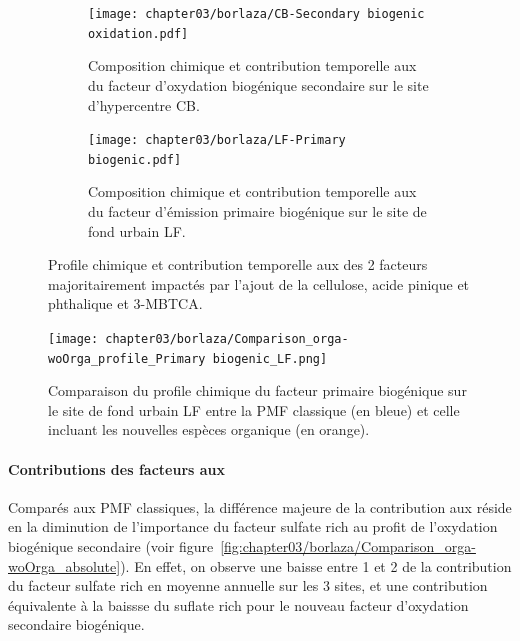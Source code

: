 \begin{figure}[ht]
    \centering
    \begin{subfigure}[t]{1\textwidth}
    \begin{center}
        \texttt{[image: chapter03/borlaza/CB-Secondary biogenic oxidation.pdf]}
    \end{center}
    \caption{Composition chimique et contribution temporelle aux \PMdix{} du facteur
    d'oxydation biogénique secondaire sur le site d'hypercentre CB.}%
    \label{fig:chapter03/borlaza/CB-SBO}
    \end{subfigure}
    \begin{subfigure}[t]{1\textwidth}
    \begin{center}
        \texttt{[image: chapter03/borlaza/LF-Primary biogenic.pdf]}
    \end{center}
    \caption{Composition chimique et contribution temporelle aux \PMdix{} du facteur
    d'émission primaire biogénique sur le site de fond urbain LF.}%
    \label{fig:chapter03/borlaza/LF-PBOA}
    \end{subfigure}
    \caption{Profile chimique et contribution temporelle aux \PMdix{} des 2 facteurs
        majoritairement impactés par l'ajout de la cellulose, acide pinique et phthalique
        et 3-MBTCA.
    }%
    \label{fig:chapter03/borlaza/pmf_profiles}
\end{figure}

\begin{figure}[ht]
    \centering
    \texttt{[image: chapter03/borlaza/Comparison\_orga-woOrga\_profile\_Primary biogenic\_LF.png]}
    \caption{Comparaison du profile chimique du facteur primaire biogénique sur le site de
        fond urbain LF entre la PMF classique (en bleue) et celle incluant les nouvelles
    espèces organique (en orange).}%
    \label{fig:chapter03/borlaza/comparaison-classique-orga}
\end{figure}

\paragraph{Contributions des facteurs aux \PMdix}%
\label{par:contributions_des_facteurs_aux_pmdix}

Comparés aux PMF classiques, la différence majeure de la contribution aux \PMdix{} réside en
la diminution de l'importance du facteur sulfate rich au profit de l'oxydation biogénique
secondaire (voir figure~\ref{fig:chapter03/borlaza/Comparison_orga-woOrga_absolute}).
En effet, on observe une baisse entre \SI{1}{\ugm} et \SI{2}{\ugm} de la contribution du
facteur sulfate rich en moyenne annuelle sur les 3 sites, et une contribution équivalente à
la baissse du suflate rich pour le nouveau facteur d'oxydation secondaire biogénique.

